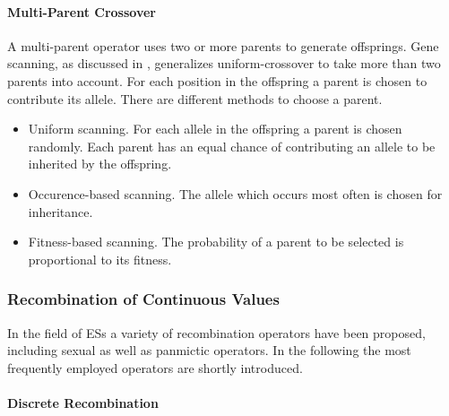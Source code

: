 	\paragraph{Multi-Parent Crossover}

A multi-parent operator uses two or more parents to generate
offsprings. Gene scanning, as discussed in \cite{Eiben:94},
generalizes uniform-crossover to take more than two parents into
account. For each position in the offspring a parent is chosen to
contribute its allele. There are different methods to choose a parent.

\begin{itemize}

  \item Uniform scanning. For each allele in the offspring a parent is
        chosen randomly.  Each parent has an equal chance of
        contributing an allele to be inherited by the offspring.

  \item Occurence-based scanning. The allele which occurs most often
        is chosen for inheritance.

  \item Fitness-based scanning. The probability of a parent to be
        selected is proportional to its fitness.

\end{itemize}



	\subsubsection{Recombination of Continuous Values}
	\label{recombination:subsubs:recombinationOfContinuesValues}

In the field of ESs a variety of recombination operators have been
proposed, including sexual as well as panmictic operators.  In the
following the most frequently employed operators are shortly
introduced.


	\paragraph{Discrete Recombination}

